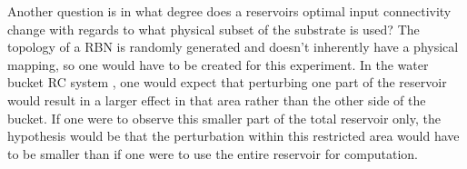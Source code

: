 Another question is in what degree does a reservoirs optimal input connectivity change with regards to what physical subset of the substrate is used?
The topology of a RBN is randomly generated and doesn't inherently have a physical mapping,
so one would have to be created for this experiment.
In the water bucket RC system \cite{fernando2003pattern},
one would expect that perturbing one part of the reservoir would result in a larger effect in that area rather than the other side of the bucket.
If one were to observe this smaller part of the total reservoir only,
the hypothesis would be that the perturbation within this restricted area would have to be smaller than if one were to use the entire reservoir for computation.

